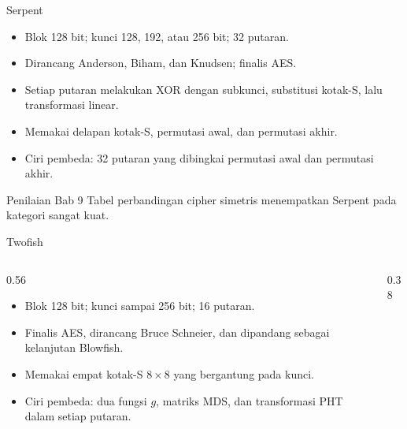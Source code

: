 \documentclass[aspectratio=169,11pt]{beamer}
\begin{document}
\begin{frame}{Serpent}
    \footnotesize
    \begin{itemize}
        \item Blok 128 bit; kunci 128, 192, atau 256 bit; 32 putaran.
        \item Dirancang Anderson, Biham, dan Knudsen; finalis AES.
        \item Setiap putaran melakukan XOR dengan subkunci, substitusi
              kotak-S, lalu transformasi linear.
        \item Memakai delapan kotak-S, permutasi awal, dan permutasi akhir.
        \item Ciri pembeda: 32 putaran yang dibingkai permutasi awal dan
              permutasi akhir.
    \end{itemize}
    \vspace{0.1cm}
    \begin{exampleblock}{Penilaian Bab 9}
        \footnotesize
        Tabel perbandingan cipher simetris menempatkan Serpent pada
        kategori sangat kuat.
    \end{exampleblock}
\end{frame}

\begin{frame}{Twofish}
    \footnotesize
    \begin{columns}[T,onlytextwidth]
        \begin{column}{0.56\textwidth}
            \begin{itemize}
                \item Blok 128 bit; kunci sampai 256 bit; 16 putaran.
                \item Finalis AES, dirancang Bruce Schneier, dan
                      dipandang sebagai kelanjutan Blowfish.
                \item Memakai empat kotak-S $8 \times 8$ yang bergantung
                      pada kunci.
                \item Ciri pembeda: dua fungsi $g$, matriks MDS, dan
                      transformasi PHT dalam setiap putaran.
            \end{itemize}
        \end{column}
        \begin{column}{0.38\textwidth}
            \centering
        \end{column}
    \end{columns}
\end{frame}
\end{document}
